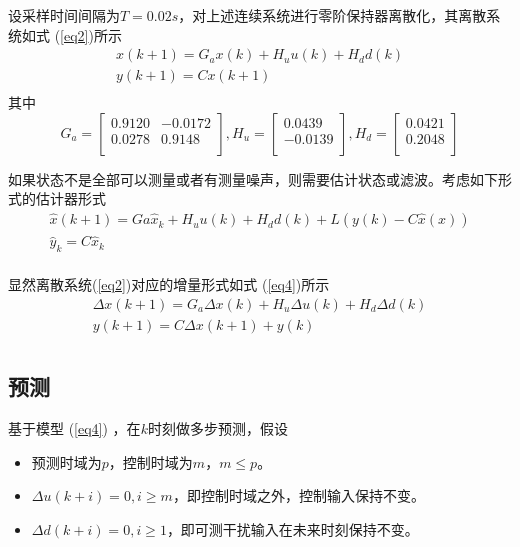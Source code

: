 \documentclass[UTF8]{article}
\begin{document}
设采样时间间隔为$T=0.02s$，对上述连续系统进行零阶保持器离散化，其离散系统如式 (\ref{eq2})所示
\begin{equation}
    \label{eq2}
    \begin{array}{c}
    x(k+1)= G_{a}x(k)+H_{u}u(k)+H_{d}d(k)\\
    y(k+1) = Cx(k+1)\\
    \end{array}
\end{equation}
其中
\[
    G_{a}=
    \left[
        \begin{array}{cc}
            0.9120 & -0.0172\\
            0.0278 & 0.9148 \\
        \end{array}
    \right],
    H_{u}=
    \left[
        \begin{array}{c}
            0.0439 \\
            -0.0139 \\
        \end{array}
    \right],
    H_{d}=
    \left[
        \begin{array}{c}
            0.0421 \\
            0.2048 \\
        \end{array}
    \right]
\]

如果状态不是全部可以测量或者有测量噪声，则需要估计状态或滤波。考虑如下形式的估计器形式
\[
    \begin{array}{c}
    \hat{x}(k+1)=Ga\hat{x}_{k}+H_{u}u(k)+H_{d}d(k)+L(y(k)-C\hat{x}(x))\\
    \hat{y}_{k}=C\hat{x}_{k}\\
    \end{array}
\]

显然离散系统(\ref{eq2})对应的增量形式如式 (\ref{eq4})所示
\begin{equation}
    \label{eq4}
    \begin{array}{c}
    \Delta x(k+1)= G_{a}\Delta x(k)+H_{u} \Delta u(k)+H_{d} \Delta d(k)\\
    y(k+1) = C \Delta x(k+1)+y(k)\\
    \end{array}
\end{equation}



\subsection{预测}
基于模型 (\ref{eq4}) ，在$k$时刻做多步预测，假设
\begin{itemize}
    \item 预测时域为$p$，控制时域为$m$，$m \leq p$。
    \item $\Delta u(k+i)=0,i \geq m$，即控制时域之外，控制输入保持不变。
    \item $\Delta d(k+i)=0,i \geq 1$，即可测干扰输入在未来时刻保持不变。
\end{itemize}
\end{document}
